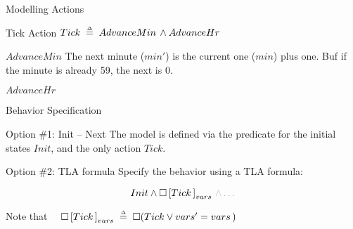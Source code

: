\begin{frame}{Modelling Actions}
    \begin{block}{Tick Action}
        $Tick \;\mathrel{\smash {{\stackrel{\scriptscriptstyle\Delta}{=}}}}\; AdvanceMin \,\land AdvanceHr$
    \end{block}
    \pause
    \begin{block}{$AdvanceMin$}
        The next minute ($min'$) is the current one ($min$) plus one. Buf if the minute is already 59, the next is 0.
        \demo
    \end{block}
    \pause
    \begin{block}{$AdvanceHr$}
    \end{block}
\end{frame}

\begin{frame}{Behavior Specification}
    \begin{block}{Option \#1: Init -- Next}
        The model is defined via the predicate for the initial states $Init$, and the only action $Tick$.
        \demo
    \end{block}
    \pause
    \begin{block}{Option \#2: TLA formula}
        Specify the behavior using a TLA formula:

        \[
            Init \land \square \left[Tick\,\right]_{vars} \textcolor{gray!60}{\,\land \ldots}
        \]
        \demo

        Note that $\quad\square \left[Tick\,\right]_{vars} \;\mathrel{\smash {{\stackrel{\scriptscriptstyle\Delta}{=}}}}\; \square ( Tick \lor vars' = vars\,)$
    \end{block}
\end{frame}

